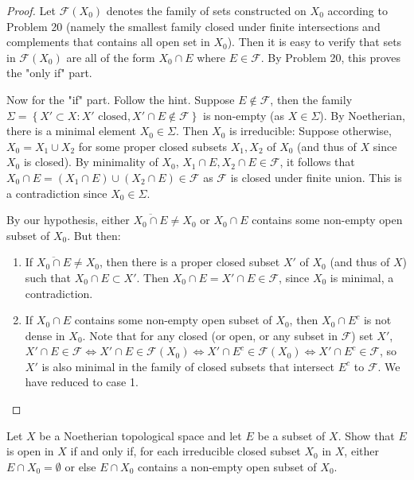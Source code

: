 \documentclass{solution}
\begin{document}
\begin{proof}
    Let $\mathcal{F}(X_0)$ denotes the family of sets constructed on $X_0$ according to Problem 20 (namely the smallest family closed under finite intersections and complements that contains all open set in $X_0$). Then it is easy to verify that sets in $\mathcal{F}(X_0)$ are all of the form $X_0 \cap E$ where $E \in \mathcal{F}$. By Problem 20, this proves the "only if" part.

    Now for the "if" part. Follow the hint. Suppose $E \notin \mathcal{F}$, then the family $\Sigma = \left\lbrace X' \subset X: X' \text{ closed}, X' \cap E \notin \mathcal{F} \right\rbrace$ is non-empty (as $X \in \Sigma$). By Noetherian, there is a minimal element $X_0 \in \Sigma$. Then $X_0$ is irreducible: Suppose otherwise, $X_0 = X_1 \cup X_2$ for some proper closed subsets $X_1, X_2$ of $X_0$ (and thus of $X$ since $X_0$ is closed). By minimality of $X_0$, $X_1 \cap E, X_2 \cap E \in \mathcal{F}$, it follows that $X_0 \cap E = (X_1 \cap E) \cup (X_2 \cap E) \in \mathcal{F}$ as $\mathcal{F}$ is closed under finite union. This is a contradiction since $X_0 \in \Sigma$.

    By our hypothesis, either $\overline{X_0 \cap E} \ne X_0$ or $X_0 \cap E$ contains some non-empty open subset of $X_0$. But then:
    \begin{enumerate}
        \item If $\overline{X_0 \cap E} \ne X_0$, then there is a proper closed subset $X'$ of $X_0$ (and thus of $X$) such that $X_0 \cap E \subset X'$. Then $X_0 \cap E = X' \cap E \in \mathcal{F}$, since $X_0$ is minimal, a contradiction.
        \item If $X_0 \cap E$ contains some non-empty open subset of $X_0$, then $X_0 \cap E^c$ is not dense in $X_0$. Note that for any closed (or open, or any subset in $\mathcal{F}$) set $X'$, $X' \cap E \in \mathcal{F} \Leftrightarrow X' \cap E \in \mathcal{F}(X_0) \Leftrightarrow X' \cap E^c \in \mathcal{F}(X_0) \Leftrightarrow X' \cap E^c \in \mathcal{F}$, so $X'$ is also minimal in the family of closed subsets that intersect $E^c$ to $\mathcal{F}$. We have reduced to case 1.
    \end{enumerate}
\end{proof}

\begin{problem}
    Let $X$ be a Noetherian topological space and let $E$ be a subset of $X$. Show that $E$ is open in $X$ if and only if, for each irreducible closed subset $X_0$ in $X$, either $E \cap X_0 = \emptyset$ or else $E \cap X_0$ contains a non-empty open subset of $X_0$.
\end{problem}
\end{document}
